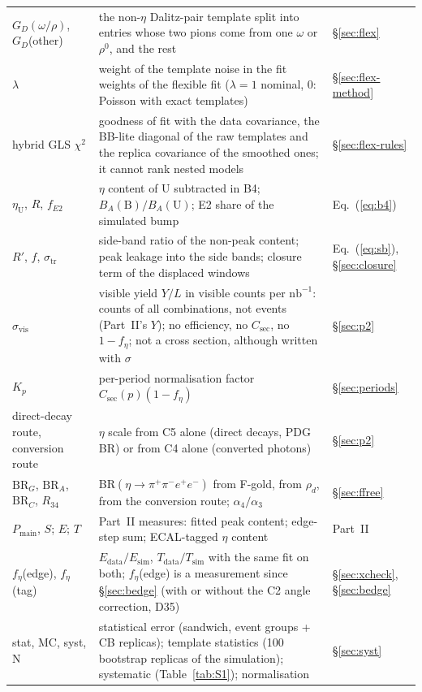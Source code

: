 \documentclass[11pt,a4paper]{article}
\newcommand{\ppee}{\ensuremath{\pi^{+}\pi^{-}e^{+}e^{-}}\xspace}
\newcommand{\nbinv}{\ensuremath{\mathrm{nb}^{-1}}\xspace}
\newcommand{\Pmain}{\ensuremath{P_{\mathrm{main}}}\xspace}
\newcommand{\rhod}{\ensuremath{\rho_d}\xspace}
\newcommand{\Csec}{\ensuremath{C_{\mathrm{sec}}}\xspace}
\newcommand{\feta}{\ensuremath{f_\eta}\xspace}
\newcommand{\BRG}{\ensuremath{\mathrm{BR}_G}\xspace}
\newcommand{\BRA}{\ensuremath{\mathrm{BR}_A}\xspace}
\newcommand{\BRC}{\ensuremath{\mathrm{BR}_C}\xspace}
\begin{document}
{\begin{longtable}{@{}>{\raggedright\arraybackslash}p{3.0cm} >{\raggedright\arraybackslash}p{\dimexpr\textwidth-3.0cm-2.0cm-4\tabcolsep\relax} >{\raggedright\arraybackslash}p{2.0cm}@{}}
$G_D(\omega/\rho)$, $G_D$(other) & the non-$\eta$ Dalitz-pair template split into entries whose two pions come from one $\omega$ or $\rho^0$, and the rest & \S\ref{sec:flex} \\
$\lambda$ & weight of the template noise in the fit weights of the flexible fit ($\lambda=1$ nominal, 0: Poisson with exact templates) & \S\ref{sec:flex-method} \\
hybrid GLS $\chi^2$ & goodness of fit with the data covariance, the BB-lite diagonal of the raw templates and the replica covariance of the smoothed ones; it cannot rank nested models & \S\ref{sec:flex-rules} \\
$\eta_{\mathrm{U}}$, $R$, $f_{E2}$ & $\eta$ content of U subtracted in B4; $B_A(\mathrm{B})/B_A(\mathrm{U})$; E2 share of the simulated bump & Eq.~(\ref{eq:b4}) \\
$R'$, $f$, $\sigma_{\mathrm{tr}}$ & side-band ratio of the non-peak content; peak leakage into the side bands; closure term of the displaced windows & Eq.~(\ref{eq:sb}), \S\ref{sec:closure} \\
$\sigma_{\mathrm{vis}}$ & visible yield $Y/L$ in visible counts per \nbinv: counts of all combinations, not events (Part~II's $Y$); no efficiency, no \Csec, no $1-\feta$; not a cross section, although written with $\sigma$ & \S\ref{sec:p2} \\
$K_p$ & per-period normalisation factor $\Csec(p)(1-\feta)$ & \S\ref{sec:periods} \\
direct-decay route, conversion route & $\eta$ scale from C5 alone (direct decays, PDG BR) or from C4 alone (converted photons) & \S\ref{sec:p2} \\
\BRG, \BRA, \BRC, $R_{34}$ & BR$(\eta\to\ppee)$ from F-gold, from \rhod, from the conversion route; $\alpha_4/\alpha_3$ & \S\ref{sec:ffree} \\
\Pmain, $S$; $E$; $T$ & Part~II measures: fitted peak content; edge-step sum; ECAL-tagged $\eta$ content & Part~II \\
$f_\eta$(edge), $f_\eta$(tag) & $E_{\mathrm{data}}/E_{\mathrm{sim}}$, $T_{\mathrm{data}}/T_{\mathrm{sim}}$ with the same fit on both; $f_\eta$(edge) is a measurement since \S\ref{sec:bedge} (with or without the C2 angle correction, D35) & \S\ref{sec:xcheck}, \S\ref{sec:bedge} \\
stat, MC, syst, N & statistical error (sandwich, event groups + CB replicas); template statistics (100 bootstrap replicas of the simulation); systematic (Table~\ref{tab:S1}); normalisation & \S\ref{sec:syst} \\

\end{longtable}}
\end{document}
